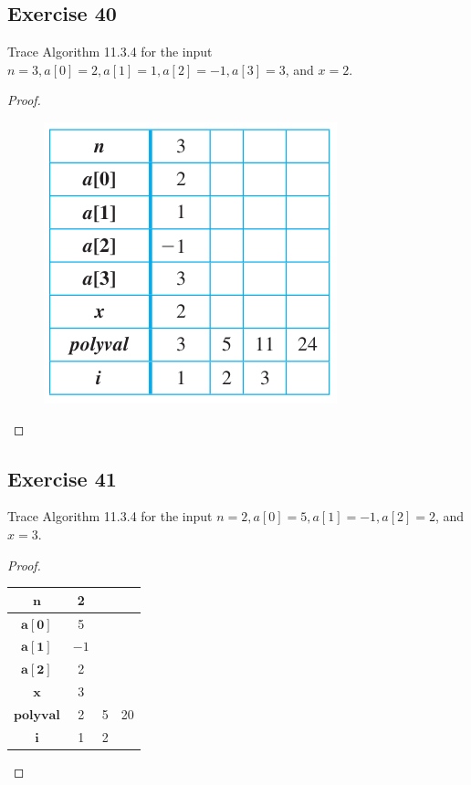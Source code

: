 \documentclass[14pt]{extarticle}
\begin{document}
\subsection{Exercise 40}
Trace Algorithm 11.3.4 for the input \(n = 3, a[0] = 2, a[1] = 1, a[2] = -1, a[3] = 3\), and \(x = 2\).

\begin{proof}
    \begin{figure}[ht!]
        \centering
        \includegraphics[scale=0.6]{../images/11.3.40.png}
    \end{figure}
\end{proof}

\subsection{Exercise 41}
Trace Algorithm 11.3.4 for the input \(n = 2, a[0] = 5, a[1] = -1, a[2] = 2\), and \(x = 3\).

\begin{proof}
    \begin{center}
        \begin{tabular}{|c|c|c|c|}
            \hline
            \(\bm{n}\)       & 2    &   &    \\
            \hline
            \(\bm{a[0]}\)    & 5    &   &    \\
            \hline
            \(\bm{a[1]}\)    & $-1$ &   &    \\
            \hline
            \(\bm{a[2]}\)    & 2    &   &    \\
            \hline
            \(\bm{x}\)       & 3    &   &    \\
            \hline
            \(\bm{polyval}\) & 2    & 5 & 20 \\
            \hline
            \(\bm{i}\)       & 1    & 2 &    \\
            \hline
        \end{tabular}
    \end{center}
\end{proof}
\end{document}

